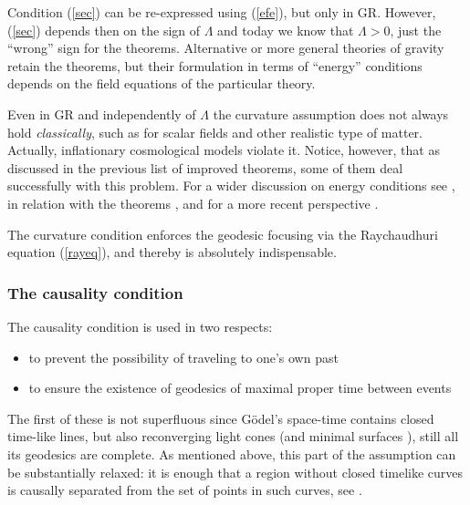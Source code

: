 \documentclass[12pt]{iopart}
\begin{document}
Condition (\ref{sec}) can be re-expressed using (\ref{efe}), but only in GR. However, (\ref{sec})  depends then on the sign of $\Lambda$ and today we know that $\Lambda > 0$, just the ``wrong''
sign for the theorems. Alternative or more general theories of gravity retain the theorems, but their formulation in terms of ``energy'' conditions depends on the field equations of the particular theory. 

Even in GR and independently of $\Lambda$ the curvature assumption does not always hold \cite{HE,S1} {\em classically}, such as for scalar fields and other realistic type of matter. Actually, inflationary cosmological models violate it. Notice, however, that as discussed in the previous list of improved theorems, some of them deal successfully  with this problem. For a wider discussion on energy conditions see \cite{Vi}, in relation with the theorems \cite{S1}, and for a more recent perspective \cite{Cu}. 

The curvature condition enforces the geodesic focusing via the Raychaudhuri equation (\ref{rayeq}), and thereby is absolutely indispensable. 



\subsubsection{The causality condition}\label{subsec:causalcond}
The causality condition is used in two respects:
\begin{itemize}
\item to prevent the possibility of traveling to one's own past 
\item to ensure the existence of geodesics of maximal proper time between events
\end{itemize}
The first of these is not superfluous
since G\"odel's space-time contains closed 
time-like lines, but also reconverging light cones \cite{Bor2} (and minimal surfaces \cite{Ne1,Bor2,Kri,MS}), still all its geodesics are complete. As mentioned above, this part of the assumption can be substantially relaxed: it is enough that 
a region without closed timelike curves is causally separated from the set of points in such curves, see \cite{MI}.
\end{document}
